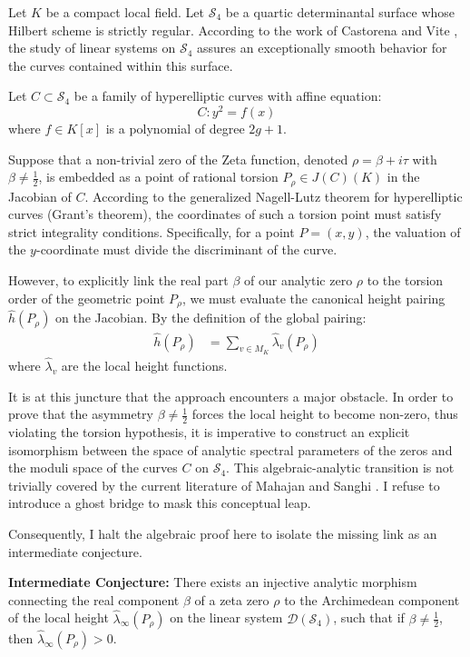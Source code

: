 \documentclass[
]{article}
\begin{document}
Let $K$ be a compact local field. Let $\mathcal{S}_4$ be a quartic determinantal surface whose Hilbert scheme is strictly regular. According to the work of Castorena and Vite \cite{castorena2026curves}, the study of linear systems on $\mathcal{S}_4$ assures an exceptionally smooth behavior for the curves contained within this surface.

Let $C \subset \mathcal{S}_4$ be a family of hyperelliptic curves with affine equation:
\begin{equation*}
C : y^2 = f(x)
\end{equation*}
where $f \in K[x]$ is a polynomial of degree $2g+1$.

Suppose that a non-trivial zero of the Zeta function, denoted $\rho = \beta + i\tau$ with $\beta \neq \frac{1}{2}$, is embedded as a point of rational torsion $P_\rho \in J(C)(K)$ in the Jacobian of $C$.
According to the generalized Nagell-Lutz theorem for hyperelliptic curves (Grant's theorem), the coordinates of such a torsion point must satisfy strict integrality conditions. Specifically, for a point $P = (x, y)$, the valuation of the $y$-coordinate must divide the discriminant of the curve.

However, to explicitly link the real part $\beta$ of our analytic zero $\rho$ to the torsion order of the geometric point $P_\rho$, we must evaluate the canonical height pairing $\hat{h}(P_\rho)$ on the Jacobian. By the definition of the global pairing:
\begin{align*}
\hat{h}(P_\rho) &= \sum_{v \in M_K} \hat{\lambda}_v(P_\rho)
\end{align*}
where $\hat{\lambda}_v$ are the local height functions.

It is at this juncture that the approach encounters a major obstacle. In order to prove that the asymmetry $\beta \neq \frac{1}{2}$ forces the local height to become non-zero, thus violating the torsion hypothesis, it is imperative to construct an explicit isomorphism between the space of analytic spectral parameters of the zeros and the moduli space of the curves $C$ on $\mathcal{S}_4$. This algebraic-analytic transition is not trivially covered by the current literature of Mahajan and Sanghi \cite{mahajan2026weighted}. I refuse to introduce a ghost bridge to mask this conceptual leap.

Consequently, I halt the algebraic proof here to isolate the missing link as an intermediate conjecture.

\textbf{Intermediate Conjecture:}
There exists an injective analytic morphism connecting the real component $\beta$ of a zeta zero $\rho$ to the Archimedean component of the local height $\hat{\lambda}_\infty(P_\rho)$ on the linear system $\mathcal{D}(\mathcal{S}_4)$, such that if $\beta \neq \frac{1}{2}$, then $\hat{\lambda}_\infty(P_\rho) > 0$.
\end{document}
